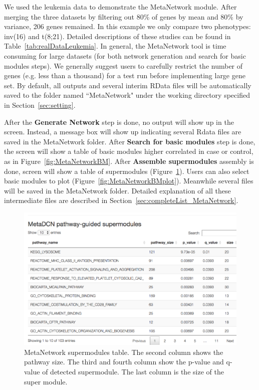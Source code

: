 We used the leukemia data to demonstrate the MetaNetwork module.
After merging the three datasets by filtering out 80\% of genes by mean and 80\% by variance, 206 genes remained.
In this example we only compare two phenotypes: inv(16) and t(8;21).
Detailed descriptions of these studies can be found in Table~\ref{tab:realDataLeukemia}. 
In general, the MetaNetwork tool is time consuming for large datasets (for both network generation and search for basic modules steps).
We generally suggest users to carefully restrict the number of genes (e.g. less than a thousand) for a test run before implementing large gene set.
By default, all outputs and several interim RData files will be automatically saved to the folder named ``MetaNetwork" under the working directory specified in Section~\ref{sec:setting}.




After the  \textbf{Generate Network} step is done, 
no output will show up in the screen. Instead, a message box will show up indicating several Rdata files are saved in the MetaNetwork folder. 
After \textbf{Search for basic modules} step is done, the screen will show a table of basic modules higher correlated in case or control, 
as in Figure~\ref{fig:MetaNetworkBM}. 
After \textbf{Assemble supermodules} assembly is done, screen will show a table of supermodules (Figure~\ref{fig:MetaNetworksuper}). 
Users can also select basic modules to plot (Figure~\ref{fig:MetaNetworkBMplot}). 
Meanwhile several files will be saved in the MetaNetwork folder.
Detailed explanation of all these intermediate files are described in Section~\ref{sec:completeList_MetaNetwork}.

\begin{figure}[H]
\begin{center}
\includegraphics[scale=0.7]{./figure/MetaNetwork/MetaNetworksuper.png}
\caption{MetaNetwork supermodules table.
The second column shows the pathway size.
The third and fourth column show the p-value and q-value of detected supermodule.
The last column is the size of the super module.
}
\label{fig:MetaNetworksuper}
\end{center}
\end{figure}


